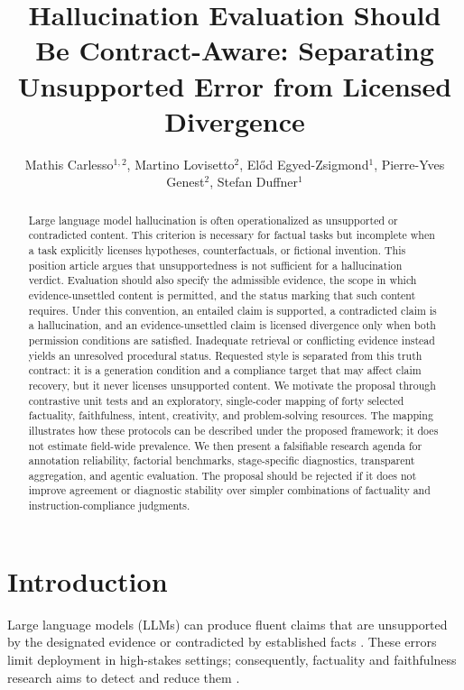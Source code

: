 \documentclass{clv2025}
\title{Hallucination Evaluation Should Be Contract-Aware: Separating Unsupported Error from Licensed Divergence}
\author{Mathis Carlesso$^{1,2}$, Martino Lovisetto$^{2}$, El\H{o}d Egyed-Zsigmond$^{1}$, Pierre-Yves Genest$^{2}$, Stefan Duffner$^{1}$}
\affil{INSA Lyon, CNRS, LIRIS, UMR5205, Universit\'e Claude Bernard Lyon 1, 69621 Villeurbanne, France\\
  \quad \email{mathis.carlesso@insa-lyon.fr}}
\affil{Alteca, 69100 Villeurbanne, France}
\begin{document}
\maketitle

\begin{abstract}
Large language model hallucination is often operationalized as unsupported or contradicted content.
This criterion is necessary for factual tasks but incomplete when a task explicitly licenses hypotheses, counterfactuals, or fictional invention.
This position article argues that unsupportedness is not sufficient for a hallucination verdict.
Evaluation should also specify the admissible evidence, the scope in which evidence-unsettled content is permitted, and the status marking that such content requires.
Under this convention, an entailed claim is supported, a contradicted claim is a hallucination, and an evidence-unsettled claim is licensed divergence only when both permission conditions are satisfied.
Inadequate retrieval or conflicting evidence instead yields an unresolved procedural status.
Requested style is separated from this truth contract: it is a generation condition and a compliance target that may affect claim recovery, but it never licenses unsupported content.
We motivate the proposal through contrastive unit tests and an exploratory, single-coder mapping of forty selected factuality, faithfulness, intent, creativity, and problem-solving resources.
The mapping illustrates how these protocols can be described under the proposed framework; it does not estimate field-wide prevalence.
We then present a falsifiable research agenda for annotation reliability, factorial benchmarks, stage-specific diagnostics, transparent aggregation, and agentic evaluation.
The proposal should be rejected if it does not improve agreement or diagnostic stability over simpler combinations of factuality and instruction-compliance judgments.
\end{abstract}

\section{Introduction}\label{sec:intro}

Large language models (LLMs) can produce fluent claims that are unsupported by the designated evidence or contradicted by established facts \citep{ji_survey_2023,huang_survey_2025}.
These errors limit deployment in high-stakes settings; consequently, factuality and faithfulness research aims to detect and reduce them \citep{lin_truthfulqa_2022,li_halueval_2023,wei_measuring_2024}.
\end{document}
